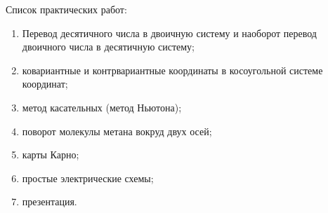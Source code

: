 \documentclass[a4paper,landscape,11pt]{article}
\begin{document}
\hspace{-2cm}
\begin{center} {\large Список практических работ:} \end{center}
\begin{enumerate}
\item Перевод десятичного числа в двоичную систему и наоборот перевод двоичного числа в десятичную систему;
\item ковариантные и контрвариантные координаты в косоугольной системе координат;
\item метод касательных (метод Ньютона);
\item поворот молекулы метана вокруд двух осей;
\item карты Карно;
\item простые электрические схемы;
\item презентация.
\end{enumerate}
\end{document}
